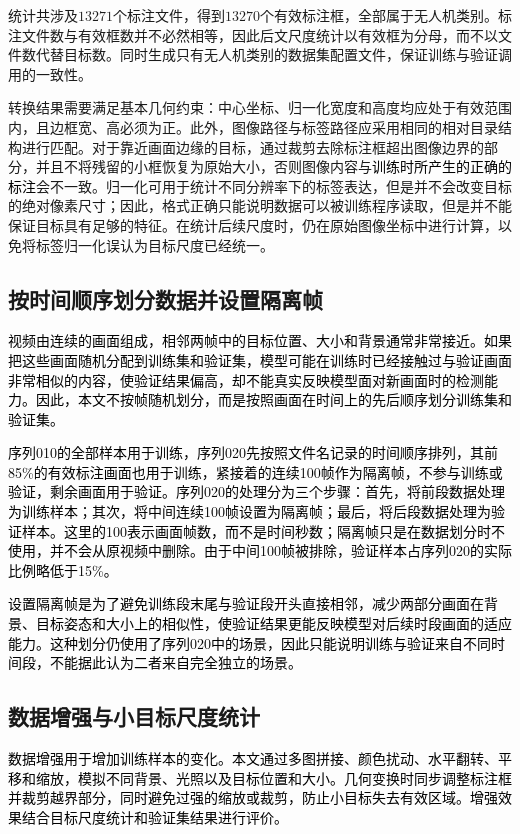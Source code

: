 统计共涉及$13271$个标注文件，得到$13270$个有效标注框，全部属于无人机类别。标注文件数与有效框数并不必然相等，因此后文尺度统计以有效框为分母，而不以文件数代替目标数。同时生成只有无人机类别的数据集配置文件，保证训练与验证调用的一致性。

转换结果需要满足基本几何约束：中心坐标、归一化宽度和高度均应处于有效范围内，且边框宽、高必须为正。此外，图像路径与标签路径应采用相同的相对目录结构进行匹配。对于靠近画面边缘的目标，通过裁剪去除标注框超出图像边界的部分，并且不将残留的小框恢复为原始大小，否则图像内容与\textcolor{black}{训练时所产生的正确的标注}会不一致。归一化可用于统计不同分辨率下的标签表达，但是并不会改变目标的绝对像素尺寸；因此，格式正确只能说明数据可以被训练程序读取，但是并不能保证目标具有足够的特征。在统计后续尺度时，仍在原始图像坐标中进行计算，以免将标签归一化误认为目标尺度已经统一。

\subsection{按时间顺序划分数据并设置隔离帧}

\textcolor{black}{视频由连续的画面组成，相邻两帧中的目标位置、大小和背景通常非常接近。如果把这些画面随机分配到训练集和验证集，模型可能在训练时已经接触过与验证画面非常相似的内容，使验证结果偏高，却不能真实反映模型面对新画面时的检测能力。因此，本文不按帧随机划分，而是按照画面在时间上的先后顺序划分训练集和验证集。}

\textcolor{black}{序列010的全部样本用于训练，序列020先按照文件名记录的时间顺序排列，其前85\%的有效标注画面也用于训练，紧接着的连续100帧作为隔离帧，不参与训练或验证，剩余画面用于验证。序列020的处理分为三个步骤：首先，将前段数据处理为训练样本；其次，将中间连续100帧设置为隔离帧；最后，将后段数据处理为验证样本。这里的100表示画面帧数，而不是时间秒数；隔离帧只是在数据划分时不使用，并不会从原视频中删除。由于中间100帧被排除，验证样本占序列020的实际比例略低于15\%。}

\textcolor{black}{设置隔离帧是为了避免训练段末尾与验证段开头直接相邻，减少两部分画面在背景、目标姿态和大小上的相似性，使验证结果更能反映模型对后续时段画面的适应能力。这种划分仍使用了序列020中的场景，因此只能说明训练与验证来自不同时间段，不能据此认为二者来自完全独立的场景。}

\subsection{数据增强与小目标尺度统计}

\textcolor{black}{数据增强用于增加训练样本的变化。本文通过多图拼接、颜色扰动、水平翻转、平移和缩放，模拟不同背景、光照以及目标位置和大小。几何变换时同步调整标注框并裁剪越界部分，同时避免过强的缩放或裁剪，防止小目标失去有效区域。增强效果结合目标尺度统计和验证集结果进行评价。}

